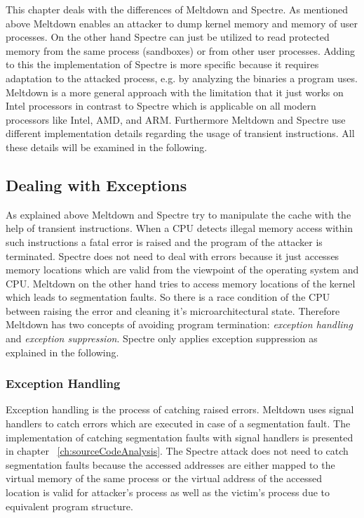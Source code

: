 \documentclass[a4paper,oneside,openright] {scrreprt}
\begin{document}
This chapter deals with the differences of Meltdown and Spectre. As mentioned above Meltdown enables an attacker 
to dump kernel memory and memory of user processes. On the other hand Spectre can just be utilized to read protected memory from 
the same process (sandboxes) or from other user processes.
Adding to this the implementation of Spectre is more specific because it requires adaptation to the attacked process,
 e.g. by analyzing the binaries a program uses. Meltdown is a more general approach with the limitation that it just works on Intel
 processors in contrast to Spectre which is applicable on all modern processors like Intel, AMD, and ARM. Furthermore Meltdown and 
 Spectre use different implementation details regarding the usage of transient instructions.
 All these details will be examined in the following.

\subsection{Dealing with Exceptions}
\label{ch:intro:motivation:A}

As explained above Meltdown and Spectre try to manipulate the cache with the help of transient instructions. 
When a CPU detects illegal memory access within such instructions a fatal error is raised and the program of the attacker
is terminated. Spectre does not need to deal with errors because it just accesses memory locations which are valid from
the viewpoint of the operating system and CPU.
Meltdown on the other hand tries to access memory locations of the kernel which leads to segmentation faults.
So there is a race condition of the CPU between raising the error and cleaning it's microarchitectural state.
Therefore Meltdown has two concepts of avoiding program termination: \textit{exception handling} and \textit{exception suppression}.
Spectre only applies exception suppression as explained in the following.

\subsubsection{Exception Handling}

Exception handling is the process of catching raised errors. Meltdown uses signal handlers to catch errors
which are executed in case of a segmentation fault. The implementation of catching 
segmentation faults with signal handlers is presented in chapter ~\ref{ch:sourceCodeAnalysis}.
The Spectre attack does not need to catch segmentation faults because the accessed addresses are either
mapped to the virtual memory of the same process or the virtual address of the accessed location is valid 
for attacker's process as well as the victim's process due to equivalent program structure.
\end{document}
